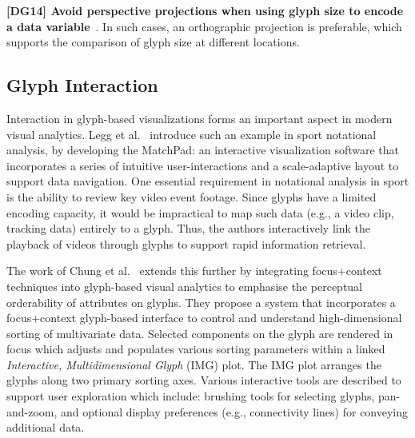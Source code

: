 \textbf{[DG14] Avoid perspective projections when using glyph size to encode a data variable}~\cite{Ropinski11glyphs}.
In such cases, an orthographic projection is preferable, which supports the comparison of glyph size at different locations.





\subsection{Glyph Interaction}
\label{sec:interaction}

Interaction in glyph-based visualizations forms an important aspect in modern visual analytics.
Legg et al.~\cite{legg12matchPad} introduce such an example in sport notational analysis, by developing the MatchPad: an interactive visualization software that incorporates a series of intuitive user-interactions and a scale-adaptive layout to support data navigation.
One essential requirement in notational analysis in sport is the ability to review key video event footage.
Since glyphs have a limited encoding capacity, it would be impractical to map such data (e.g., a video clip, tracking data) entirely to a glyph.
Thus, the authors interactively link the playback of videos through glyphs to support rapid information retrieval.

The work of Chung et al.~\cite{chung13glyphSorting} extends this further by integrating focus+context techniques into glyph-based visual analytics to emphasise the perceptual orderability of attributes on glyphs.
They propose a system that incorporates a focus+context glyph-based interface to control and understand high-dimensional sorting of multivariate data. 
Selected components on the glyph are rendered in focus which adjusts and populates various sorting parameters within a linked \emph{Interactive, Multidimensional Glyph} (IMG) plot.
The IMG plot arranges the glyphs along two primary sorting axes. 
Various interactive tools are described to support user exploration which include: brushing tools for selecting glyphs, pan-and-zoom, and optional display preferences (e.g., connectivity lines) for conveying additional data.




